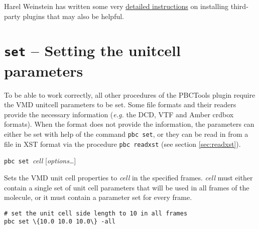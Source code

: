 \documentclass[a4paper, DIV12]{scrartcl}
\newcommand{\eg}{\emph{e.g.}\xspace}
\newcommand{\pbctools}{PBCTools\xspace}
\begin{document}
  Harel Weinstein has written some very \href{http://physiology.med.cornell.edu/faculty/hweinstein/vmdplugins/installation.html}{detailed instructions} on installing third-party plugins that may also be helpful.

\newpage
\section{\texttt{set} -- Setting the unitcell parameters}
\label{sec:set}

To be able to work correctly, all other procedures of the \pbctools
plugin require the VMD unitcell parameters to be set.  Some file
formats and their readers provide the necessary information (\eg the
DCD, VTF and Amber crdbox formats).  When the format does not provide
the information, the parameters can either be set with help of the
command \texttt{pbc set}, or they can be read in from a file in XST
format via the procedure \texttt{pbc readxst} (see section
\ref{sec:readxst}).

\mbox{\texttt{pbc} \texttt{set} \textit{cell}} [\textit{options}\dots]


Sets the VMD unit cell properties to \textit{cell} in the specified
frames. \textit{cell} must either contain a single set of unit cell
parameters that will be used in all frames of the molecule, or it must
contain a parameter set for every frame.


\begin{Verbatim} 
# set the unit cell side length to 10 in all frames
pbc set \{10.0 10.0 10.0\} -all
\end{Verbatim}

\end{document}
